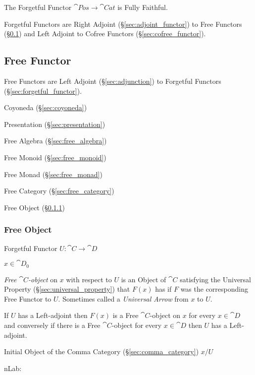 The Forgetful Functor $\cat{Pos} \rightarrow \cat{Cat}$ is
Fully Faithful.

Forgetful Functors are Right Adjoint (\S\ref{sec:adjoint_functor}) to
Free Functors (\S\ref{sec:free_functor}) and Left Adjoint to Cofree
Functors (\S\ref{sec:cofree_functor}).



\subsection{Free Functor}\label{sec:free_functor}

Free Functors are Left Adjoint (\S\ref{sec:adjunction}) to Forgetful
Functors (\S\ref{sec:forgetful_functor}).

Coyoneda (\S\ref{sec:coyoneda})

Presentation (\S\ref{sec:presentation})

Free Algebra (\S\ref{sec:free_algebra})

Free Monoid (\S\ref{sec:free_monoid})

Free Monad (\S\ref{sec:free_monad})

Free Category (\S\ref{sec:free_category})

Free Object (\S\ref{sec:free_object})



\subsubsection{Free Object}\label{sec:free_object}

Forgetful Functor $U : \cat{C} \rightarrow \cat{D}$

$x \in \cat{D}_0$

\emph{Free $\cat{C}$-object} on $x$ with respect to $U$ is an Object
of $\cat{C}$ satisfying the Universal Property
(\S\ref{sec:universal_property}) that $F(x)$ has if $F$ was the
corresponding Free Functor to $U$. Sometimes called a \emph{Universal
  Arrow} from $x$ to $U$.

If $U$ has a Left-adjoint then $F(x)$ is a Free $\cat{C}$-object on
$x$ for every $x \in \cat{D}$ and conversely if there is a Free
$\cat{C}$-object for every $x \in \cat{D}$ then $U$ has a
Left-adjoint.

Initial Object of the Comma Category (\S\ref{sec:comma_category}) $x /
U$

nLab:

